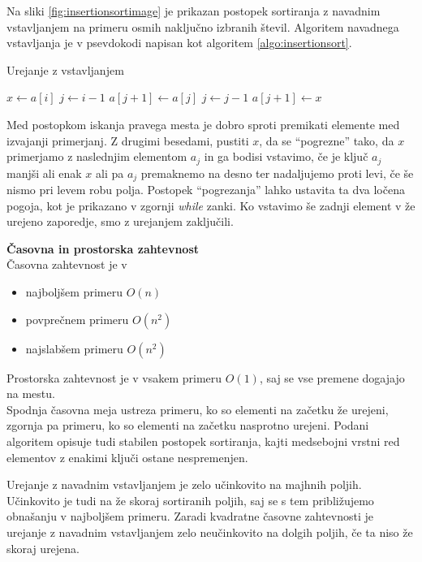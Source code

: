 \documentclass[a4paper,oneside,12pt]{article}
\newcommand{\subsubsubsection}[1]{\vspace*{1ex}\textbf{#1}\\}
\begin{document}
Na sliki \ref{fig:insertionsortimage} je prikazan postopek sortiranja z navadnim vstavljanjem na primeru osmih naključno
izbranih števil. Algoritem navadnega
vstavljanja je v psevdokodi napisan kot algoritem \ref{algo:insertionsort}.

\begin{algorithm}
  \caption{Urejanje z vstavljanjem}\label{algo:insertionsort}
  \begin{algorithmic}[1]
            \State $x \gets a[i]$
            \State $j \gets i - 1$
                \State $a[j+1] \gets a[j]$
                \State $j \gets j - 1$
            \EndWhile
            \State $a[j+1] \gets x$
        \EndFor
    \EndFunction
  \end{algorithmic}
\end{algorithm}

Med postopkom iskanja pravega mesta je dobro sproti premikati elemente med izvajanji
primerjanj. Z drugimi besedami, pustiti $x$, da se ``pogrezne'' tako, da $x$
primerjamo z naslednjim elementom $a_j$ in ga bodisi vstavimo, če je ključ $a_j$ manjši
ali enak $x$ ali pa $a_j$ premaknemo na desno ter nadaljujemo proti levi, če še nismo pri
levem robu polja. Postopek ``pogrezanja'' lahko ustavita ta dva ločena
pogoja, kot je prikazano v zgornji \emph{while} zanki.  Ko vstavimo še zadnji element v že 
urejeno zaporedje, smo z urejanjem zaključili.

\subsubsubsection{Časovna in prostorska zahtevnost}
Časovna zahtevnost je v 
\begin{itemize}
  \item najboljšem primeru $O(n)$
  \item povprečnem primeru $O(n^2)$
  \item najslabšem primeru $O(n^2)$
\end{itemize}

Prostorska zahtevnost je v vsakem primeru $O(1)$, saj se vse premene dogajajo na
mestu.\\

Spodnja časovna meja ustreza primeru, ko so elementi na začetku že urejeni, zgornja pa primeru,
ko so elementi na začetku nasprotno urejeni. Podani algoritem opisuje tudi stabilen postopek sortiranja, kajti medsebojni
vrstni red elementov z enakimi ključi ostane nespremenjen.

Urejanje z navadnim vstavljanjem je zelo učinkovito na majhnih poljih. Učinkovito je tudi na že
skoraj sortiranih poljih, saj se s tem približujemo obnašanju v najboljšem primeru.
Zaradi kvadratne časovne zahtevnosti je urejanje z navadnim vstavljanjem zelo neučinkovito na
dolgih poljih, če ta niso že skoraj urejena.
\end{document}
